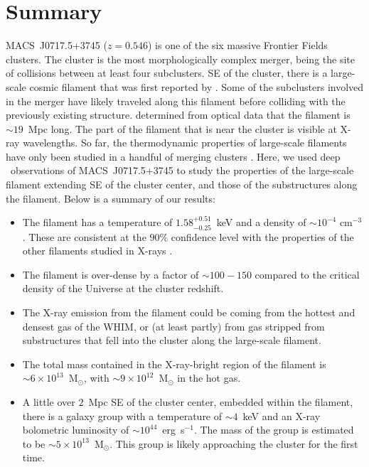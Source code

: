 \section{Summary}
\label{sec:Summary}

MACS~J0717.5+3745 ($z=0.546$) is one of the six massive Frontier Fields clusters. The cluster is the most morphologically complex merger, being the site of collisions between at least four subclusters. SE of the cluster, there is a large-scale cosmic filament that was first reported by \citet{Ebeling2004}. Some of the subclusters involved in the merger have likely traveled along this filament before colliding with the previously existing structure. \citet{Jauzac2012} determined from optical data that the filament is $\sim 19$~Mpc long. The part of the filament that is near the cluster is visible at X-ray wavelengths. So far, the thermodynamic properties of large-scale filaments have only been studied in a handful of merging clusters \citep{Werner2008, Eckert2015, Bulbul2016}. Here, we used deep \chandra\ observations of MACS~J0717.5+3745 to study the properties of the large-scale filament extending SE of the cluster center, and those of the substructures along the filament. Below is a summary of our results:

\begin{itemize}
	\item The filament has a temperature of $1.58_{-0.25}^{+0.51}$~keV and a density of $\sim 10^{-4}$ cm$^{-3}$. These are consistent at the $90\%$ confidence level with the properties of the other filaments studied in X-rays \citep{Werner2008, Eckert2015, Bulbul2016}.
	\item The filament is over-dense by a factor of $\sim 100-150$ compared to the critical density of the Universe at the cluster redshift.
	\item The X-ray emission from the filament could be coming from the hottest and densest gas of the WHIM, or (at least partly) from gas stripped from substructures that fell into the cluster along the large-scale filament.
	\item The total mass contained in the X-ray-bright region of the filament is $\sim 6\times 10^{13}$~M$_\odot$, with $\sim 9\times 10^{12}$~M$_\odot$ in the hot gas.
	\item A little over $2$~Mpc SE of the cluster center, embedded within the filament, there is a galaxy group with a temperature of $\sim 4$~keV and an X-ray bolometric luminosity of $\sim 10^{44}$~erg~s$^{-1}$. The mass of the group is estimated to be $\sim 5\times 10^{13}$~M$_\odot$. This group is likely approaching the cluster for the first time.
\end{itemize}

